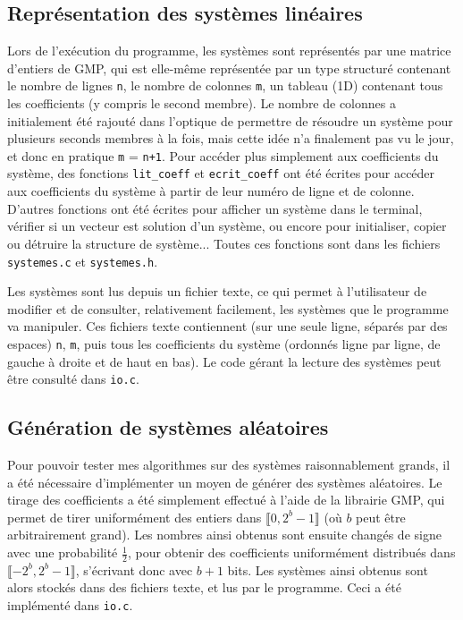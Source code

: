 \documentclass[french]{article}
\begin{document}
\subsection{Représentation des systèmes linéaires} \label{subsec:systemes}
Lors de l'exécution du programme, les systèmes sont représentés par une matrice d'entiers de GMP, qui est elle-même représentée par un type structuré contenant le nombre de lignes {\tt n}, le nombre de colonnes {\tt m}, un tableau (1D) contenant tous les coefficients (y compris le second membre). Le nombre de colonnes a initialement été rajouté dans l'optique de permettre de résoudre un système pour plusieurs seconds membres à la fois, mais cette idée n'a finalement pas vu le jour, et donc en pratique {\tt m} = {\tt n+1}.
Pour accéder plus simplement aux coefficients du système, des fonctions {\tt lit\_coeff} et {\tt ecrit\_coeff} ont été écrites pour accéder aux coefficients du système à partir de leur numéro de ligne et de colonne.
D'autres fonctions ont été écrites pour afficher un système dans le terminal, vérifier si un vecteur est solution d'un système, ou encore pour initialiser, copier ou détruire la structure de système... Toutes ces fonctions sont dans les fichiers {\tt systemes.c} et {\tt systemes.h}.
\par Les systèmes sont lus depuis un fichier texte, ce qui permet à l'utilisateur de modifier et de consulter, relativement facilement, les systèmes que le programme va manipuler. Ces fichiers texte contiennent (sur une seule ligne, séparés par des espaces) {\tt n}, {\tt m}, puis tous les coefficients du système (ordonnés ligne par ligne, de gauche à droite et de haut en bas). Le code gérant la lecture des systèmes peut être consulté dans {\tt io.c}.
\subsection{Génération de systèmes aléatoires}
Pour pouvoir tester mes algorithmes sur des systèmes raisonnablement grands, il a été nécessaire d'implémenter un moyen de générer des systèmes aléatoires. Le tirage des coefficients a été simplement effectué à l'aide de la librairie GMP, qui permet de tirer uniformément des entiers dans $\llbracket0,2^b-1\rrbracket$ (où $b$ peut être arbitrairement grand). Les nombres ainsi obtenus sont ensuite changés de signe avec une probabilité $\frac{1}{2}$, pour obtenir des coefficients uniformément distribués dans $\llbracket-2^b,2^b-1\rrbracket$, s'écrivant donc avec $b+1$ bits. Les systèmes ainsi obtenus sont alors stockés dans des fichiers texte, et lus par le programme. Ceci a été implémenté dans {\tt io.c}.
\end{document}
